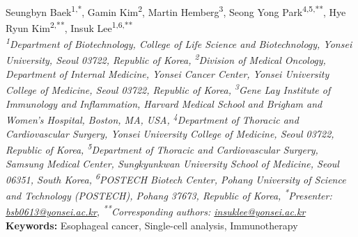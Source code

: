 \begin{center}
Seungbyn Baek\href{https://orcid.org/0000-0002-4039-277X}{\textcolor{orcidlogocol}{\aiOrcid}}\textsuperscript{1,*}, Gamin Kim\textsuperscript{2}, Martin Hemberg\textsuperscript{3}, Seong Yong Park\textsuperscript{4,5,**}, Hye Ryun Kim\textsuperscript{2,**}, Insuk Lee\textsuperscript{1,6,**} \\
\vspace{0.2cm}
\textit{\textsuperscript{1}Department of Biotechnology, College of Life Science and Biotechnology, Yonsei University, Seoul 03722, Republic of Korea, \textsuperscript{2}Division of Medical Oncology, Department of Internal Medicine, Yonsei Cancer Center, Yonsei University College of Medicine, Seoul 03722, Republic of Korea, \textsuperscript{3}Gene Lay Institute of Immunology and Inflammation, Harvard Medical School and Brigham and Women’s Hospital, Boston, MA, USA, \textsuperscript{4}Department of Thoracic and Cardiovascular Surgery, Yonsei University College of Medicine, Seoul 03722, Republic of Korea, \textsuperscript{5}Department of Thoracic and Cardiovascular Surgery, Samsung Medical Center, Sungkyunkwan University School of Medicine, Seoul 06351, South Korea, \textsuperscript{6}POSTECH Biotech Center, Pohang University of Science and Technology (POSTECH), Pohang 37673, Republic of Korea, \textsuperscript{*}Presenter: \href{mailto:bsb0613@yonsei.ac.kr}{bsb0613@yonsei.ac.kr}, \textsuperscript{**}Corresponding authors: \href{mailto:insuklee@yonsei.ac.kr}{insuklee@yonsei.ac.kr}} \\
\vspace{0.2cm}
\textbf{Keywords:} Esophageal cancer, Single-cell analysis, Immunotherapy
\end{center}

